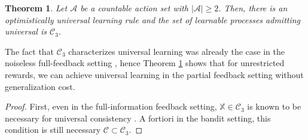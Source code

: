 \documentclass[aos]{imsart}
\theoremstyle{plain}
\newtheorem{theorem}{Theorem}[section]
\theoremstyle{remark}
\newcommand{\Acal}{\mathcal{A}}
\newcommand{\Ccal}{\mathcal{C}}
\newcommand{\Xbb}{\mathbb{X}}
\newcommand{\1}{\mathbbm{1}}%
\begin{document}
\begin{theorem}\label{thm:unbounded_rewards}
Let $\Acal$ be a countable action set with $|\Acal|\geq 2$. Then, there is an optimistically universal learning rule and the set of learnable processes admitting universal is $ \Ccal_3$.
\end{theorem}

The fact that $\Ccal_3$ characterizes universal learning was already the case in the noiseless full-feedback setting \cite{blanchard:22b}, hence Theorem \ref{thm:unbounded_rewards} shows that for unrestricted rewards, we can achieve universal learning in the partial feedback setting without generalization cost.

\begin{proof}
    First, even in the full-information feedback setting, $\Xbb\in\Ccal_3$ is known to be necessary for universal consistency \citep*{blanchard:22b}. A fortiori in the bandit setting, this condition is still necessary $\Ccal\subset\Ccal_3$.
    

\end{proof}
\end{document}
